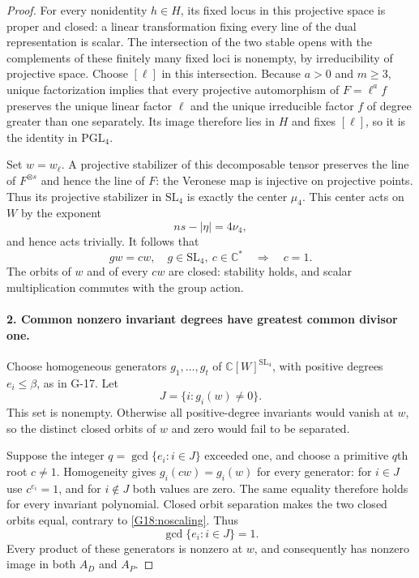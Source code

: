 \begin{proof}
For every nonidentity $h\in H$, its fixed locus in this projective
space is proper and closed: a linear transformation fixing every
line of the dual representation is scalar. The intersection of
the two stable opens with the complements of these finitely many
fixed loci is nonempty, by irreducibility of projective space.
Choose $[\ell]$ in this intersection. Because $a>0$ and $m\geq3$,
unique factorization implies that every projective automorphism of
$F=\ell^a f$ preserves the unique linear factor $\ell$ and the
unique irreducible factor $f$ of degree greater than one separately.
Its image therefore lies in $H$ and fixes $[\ell]$, so it is the
identity in $\mathrm{PGL}_4$.

Set $w=w_\ell$. A projective stabilizer of this decomposable tensor
preserves the line of $F^{\otimes s}$ and hence the line of $F$:
the Veronese map is injective on projective points. Thus its
projective stabilizer in $\mathrm{SL}_4$ is exactly the center
$\mu_4$. This center acts
on $W$ by the exponent
\[
 ns-|\eta|=4\nu_4,
\]
and hence acts trivially. It follows that
\begin{equation}\label{G18:noscaling}
 gw=cw,\quad g\in\mathrm{SL}_4,\ c\in\mathbb C^*
 \quad\Longrightarrow\quad c=1.
\end{equation}
The orbits of $w$ and of every $cw$ are closed: stability holds,
and scalar multiplication commutes with the group action.

\paragraph{2. Common nonzero invariant degrees have greatest common divisor one.}
Choose homogeneous generators $g_1,\ldots,g_t$ of
$\mathbb C[W]^{\mathrm{SL}_4}$, with positive degrees
$e_i\leq\beta$, as in G-17. Let
\[
 J=\{i:g_i(w)\ne0\}.
\]
This set is nonempty. Otherwise all positive-degree invariants
would vanish at $w$, so the distinct closed orbits of $w$ and zero
would fail to be separated.

Suppose the integer $q=\gcd\{e_i:i\in J\}$ exceeded one, and
choose a primitive $q$th root $c\ne1$. Homogeneity gives
$g_i(cw)=g_i(w)$ for every generator: for $i\in J$ use
$c^{e_i}=1$, and for $i\notin J$ both values are zero. The same
equality therefore holds for every invariant polynomial. Closed
orbit separation makes the two closed orbits equal, contrary to
\eqref{G18:noscaling}. Thus
\begin{equation}\label{G18:gcd}
 \gcd\{e_i:i\in J\}=1.
\end{equation}
Every product of these generators is nonzero at $w$, and consequently
has nonzero image in both $A_D$ and $A_P$.


\end{proof}
